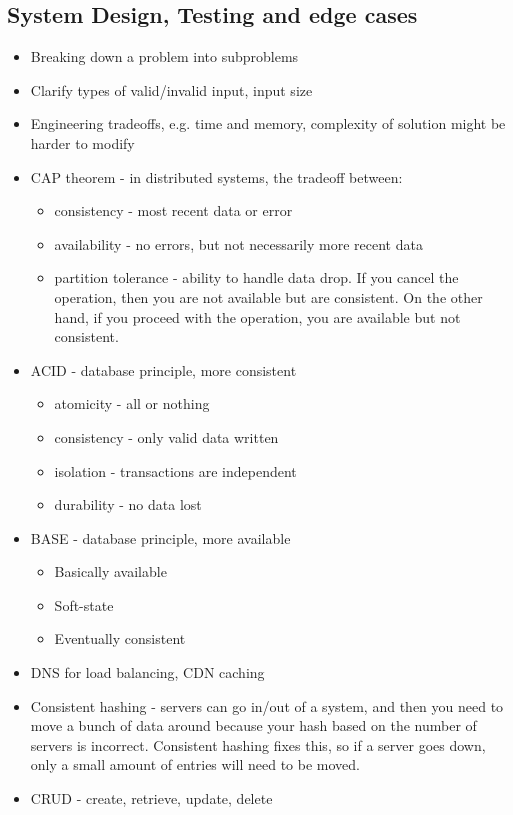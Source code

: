 \documentclass[10pt]{article}
\begin{document}
\subsection{System Design, Testing and edge cases}
\begin{itemize}
    \item Breaking down a problem into subproblems
    \item Clarify types of valid/invalid input, input size
    \item Engineering tradeoffs, e.g. time and memory, complexity of solution might be harder to modify
    \item CAP theorem - in distributed systems, the tradeoff between:
    \begin{itemize}
        \item consistency - most recent data or error
        \item availability - no errors, but not necessarily more recent data
        \item partition tolerance - ability to handle data drop. If you cancel the operation, then you are not available but are consistent. On the other hand, if you proceed with the operation, you are available but not consistent.
    \end{itemize}
    \item ACID - database principle, more consistent
    \begin{itemize}
        \item atomicity - all or nothing
        \item consistency - only valid data written
        \item isolation - transactions are independent
        \item durability - no data lost
    \end{itemize}
    \item BASE - database principle, more available
    \begin{itemize}
        \item Basically available
        \item Soft-state
        \item Eventually consistent
    \end{itemize}
    \item DNS for load balancing, CDN caching
    \item Consistent hashing - servers can go in/out of a system, and then you need to move a bunch of data around because your hash based on the number of servers is incorrect. Consistent hashing fixes this, so if a server goes down, only a small amount of entries will need to be moved.
    \item CRUD - create, retrieve, update, delete
\end{itemize}
\end{document}
